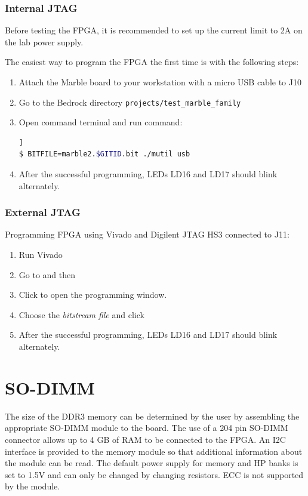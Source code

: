 \documentclass[12pt,oneside,a4]{article}
\begin{document}
\subsubsection{Internal JTAG}

\begin{leftbar}
Before testing the FPGA, it is recommended to set up the current limit to 2\thinspace A on the lab power supply.
\end{leftbar}

The easiest way to program the FPGA the first time is with the following steps:
\begin{enumerate}
	\item Attach the Marble board to your workstation with a micro USB cable to J10
	\item Go to the Bedrock directory {\tt projects/test\_marble\_family}
	\item Open command terminal and run command:
	\begin{lstlisting}[backgroundcolor = \color{Gainsboro}, language=bash, frame=none]]
$ BITFILE=marble2.$GITID.bit ./mutil usb
	\end{lstlisting}
	\item After the successful programming, LEDs LD16 and LD17 should blink alternately.
\end{enumerate}

\subsubsection{External JTAG}
Programming FPGA using Vivado and Digilent JTAG HS3 connected to J11:
\begin{enumerate}
		\item Run Vivado
		\item Go to  and then  
		\item Click  to open the programming window.
		\item Choose the \textit{bitstream file} and click 
		\item After the successful programming, LEDs LD16 and LD17 should blink alternately.
\end{enumerate}

\section{SO-DIMM}

The size of the DDR3 memory can be determined by the user by assembling the appropriate SO-DIMM module to the board. The use of a 204 pin SO-DIMM connector allows up to 4 GB of RAM to be connected to the FPGA. An I2C interface is provided to the memory module so that additional information about the module can be read. The default power supply for memory and HP banks is set to 1.5V and can only be changed by changing resistors. ECC is not supported by the module.\\
\end{document}
